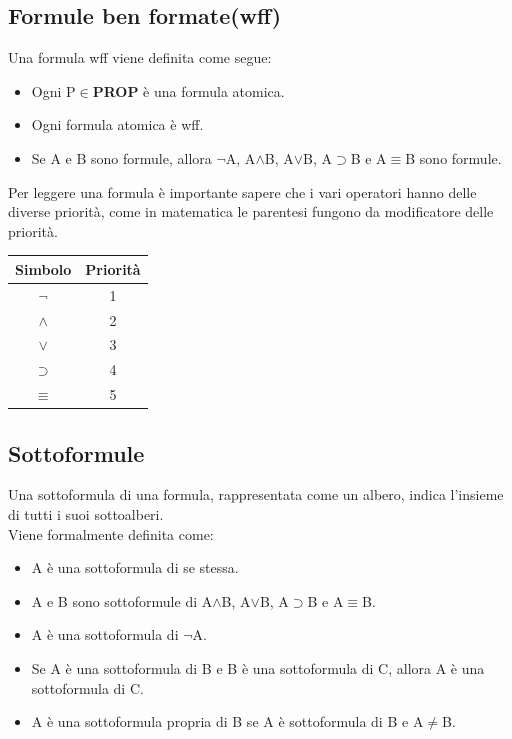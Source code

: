 \documentclass[../main.tex]{subfiles}
\begin{document}
    \subsection{Formule ben formate(wff)}
    Una formula wff viene definita come segue:
    \begin{itemize}
        \item Ogni P$\in$\textbf{PROP} è una formula atomica.
        \item Ogni formula atomica è wff.
        \item Se A e B sono formule, allora $\lnot$A, A$\land$B, A$\lor$B, A$\supset$B e A$\equiv$B sono formule.
    \end{itemize}
    Per leggere una formula è importante sapere che i vari operatori hanno delle diverse priorità, come in matematica le parentesi fungono da modificatore delle priorità.
    \begin{center}
        \begin{tabular}{c|c}
            \textbf{Simbolo} & \textbf{Priorità}\\
            \hline
            $\lnot$ & 1\\
            $\land$ & 2\\
            $\lor$ & 3\\
            $\supset$ & 4\\
            $\equiv$ & 5\\
        \end{tabular}
    \end{center}

    \subsection{Sottoformule}
    Una sottoformula di una formula, rappresentata come un albero, indica l'insieme di tutti i suoi sottoalberi.\\
    Viene formalmente definita come:
    \begin{itemize}
        \item A è una sottoformula di se stessa.
        \item A e B sono sottoformule di A$\land$B, A$\lor$B, A$\supset$B e A$\equiv$B.
        \item A è una sottoformula di $\lnot$A.
        \item Se A è una sottoformula di B e B è una sottoformula di C, allora A è una sottoformula di C.
        \item A è una sottoformula propria di B se A è sottoformula di B e A$\neq$B.
    \end{itemize}
\end{document}
